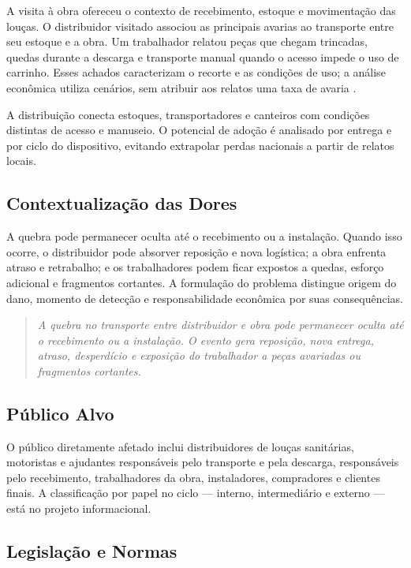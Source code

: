A visita à obra ofereceu o contexto de recebimento, estoque e movimentação das louças. O distribuidor visitado associou as principais avarias ao transporte entre seu estoque e a obra. Um trabalhador relatou peças que chegam trincadas, quedas durante a descarga e transporte manual quando o acesso impede o uso de carrinho. Esses achados caracterizam o recorte e as condições de uso; a análise econômica utiliza cenários, sem atribuir aos relatos uma taxa de avaria \citep{equipe2026}.

A distribuição conecta estoques, transportadores e canteiros com condições distintas de acesso e manuseio. O potencial de adoção é analisado por entrega e por ciclo do dispositivo, evitando extrapolar perdas nacionais a partir de relatos locais.

\subsection{Contextualização das Dores}

A quebra pode permanecer oculta até o recebimento ou a instalação. Quando isso ocorre, o distribuidor pode absorver reposição e nova logística; a obra enfrenta atraso e retrabalho; e os trabalhadores podem ficar expostos a quedas, esforço adicional e fragmentos cortantes. A formulação do problema distingue origem do dano, momento de detecção e responsabilidade econômica por suas consequências.

\begin{quote}
\itshape
A quebra no transporte entre distribuidor e obra pode permanecer oculta até o recebimento ou a instalação. O evento gera reposição, nova entrega, atraso, desperdício e exposição do trabalhador a peças avariadas ou fragmentos cortantes.
\end{quote}

\subsection{Público Alvo}

O público diretamente afetado inclui distribuidores de louças sanitárias, motoristas e ajudantes responsáveis pelo transporte e pela descarga, responsáveis pelo recebimento, trabalhadores da obra, instaladores, compradores e clientes finais. A classificação por papel no ciclo --- interno, intermediário e externo --- está no projeto informacional.

\subsection{Legislação e Normas}

